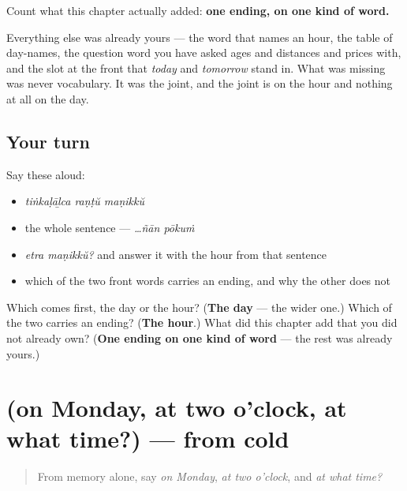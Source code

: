 \begin{grammarlens}[title={What you've built}]
Count what this chapter actually added: \textbf{one ending, on one kind of word.}

Everything else was already yours — the word that names an hour, the table of day-names, the question word you have asked ages and distances and prices with, and the slot at the front that \emph{today} and \emph{tomorrow} stand in. What was missing was never vocabulary. It was the joint, and the joint is \textbf{} on the hour and nothing at all on the day.
\end{grammarlens}

\subsection*{Your turn}
Say these aloud:

\begin{itemize}
\raggedright
  \item \emph{tiṅkaḷāḻca raṇṭŭ maṇikkŭ}
  \item the whole sentence — \emph{…ñān pōkuṁ}
  \item \emph{etra maṇikkŭ?} and answer it with the hour from that sentence
  \item which of the two front words carries an ending, and why the other does not
\end{itemize}

\begin{tcolorbox}[breakable,colback=teal!4,colframe=teal!35!black,title={Before you move on}]
Which comes first, the day or the hour? (\textbf{The day} — the wider one.) Which of the two carries an ending? (\textbf{The hour}.) What did this chapter add that you did not already own? (\textbf{One ending on one kind of word} — the rest was already yours.)
\end{tcolorbox}
\section[(on Monday, at two o'clock, at what …]{(on Monday, at two o'clock, at what time?) — from cold}

\label{lesson:ML-R102-when-recall}



\begin{quote}
From memory alone, say \emph{on Monday}, \emph{at two o'clock}, and \emph{at what time?}
\end{quote}

